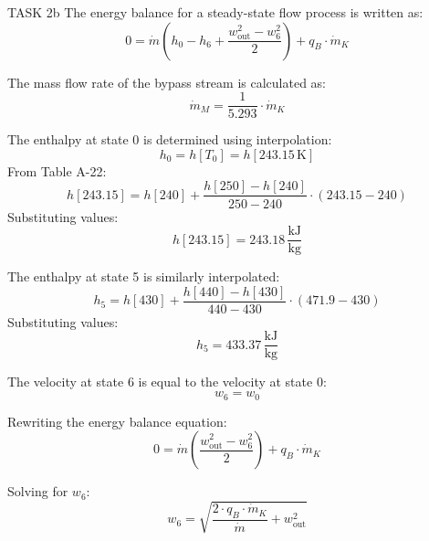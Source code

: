 TASK 2b  
The energy balance for a steady-state flow process is written as:  
\[
0 = \dot{m} \left( h_0 - h_6 + \frac{w_{\text{out}}^2 - w_6^2}{2} \right) + q_B \cdot \dot{m}_K
\]  

The mass flow rate of the bypass stream is calculated as:  
\[
\dot{m}_M = \frac{1}{5.293} \cdot \dot{m}_K
\]  

The enthalpy at state 0 is determined using interpolation:  
\[
h_0 = h[T_0] = h[243.15 \, \text{K}]
\]  
From Table A-22:  
\[
h[243.15] = h[240] + \frac{h[250] - h[240]}{250 - 240} \cdot (243.15 - 240)
\]  
Substituting values:  
\[
h[243.15] = 243.18 \, \frac{\text{kJ}}{\text{kg}}
\]  

The enthalpy at state 5 is similarly interpolated:  
\[
h_5 = h[430] + \frac{h[440] - h[430]}{440 - 430} \cdot (471.9 - 430)
\]  
Substituting values:  
\[
h_5 = 433.37 \, \frac{\text{kJ}}{\text{kg}}
\]  

The velocity at state 6 is equal to the velocity at state 0:  
\[
w_6 = w_0
\]  

Rewriting the energy balance equation:  
\[
0 = \dot{m} \left( \frac{w_{\text{out}}^2 - w_6^2}{2} \right) + q_B \cdot \dot{m}_K
\]  

Solving for \( w_6 \):  
\[
w_6 = \sqrt{\frac{2 \cdot q_B \cdot \dot{m}_K}{\dot{m}} + w_{\text{out}}^2}
\]